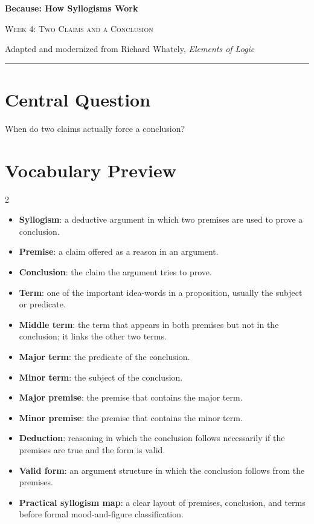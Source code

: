 \documentclass[12pt]{article}
\begin{document}
\begin{center}
{\LARGE\bfseries Because: How Syllogisms Work}\par\vspace{0.25em}
{\large\scshape Week 4: Two Claims and a Conclusion}\par\vspace{0.5em}
{Adapted and modernized from Richard Whately, \textit{Elements of Logic}}\par\vspace{0.6em}
\rule{0.82\textwidth}{0.4pt}
\end{center}

\section*{Central Question}
When do two claims actually force a conclusion?

\section*{Vocabulary Preview}
\begin{multicols}{2}
\begin{itemize}[leftmargin=*, itemsep=0.18em]
\item \textbf{Syllogism}: a deductive argument in which two premises are used to prove a conclusion.
\item \textbf{Premise}: a claim offered as a reason in an argument.
\item \textbf{Conclusion}: the claim the argument tries to prove.
\item \textbf{Term}: one of the important idea-words in a proposition, usually the subject or predicate.
\item \textbf{Middle term}: the term that appears in both premises but not in the conclusion; it links the other two terms.
\item \textbf{Major term}: the predicate of the conclusion.
\item \textbf{Minor term}: the subject of the conclusion.
\item \textbf{Major premise}: the premise that contains the major term.
\item \textbf{Minor premise}: the premise that contains the minor term.
\item \textbf{Deduction}: reasoning in which the conclusion follows necessarily if the premises are true and the form is valid.
\item \textbf{Valid form}: an argument structure in which the conclusion follows from the premises.
\item \textbf{Practical syllogism map}: a clear layout of premises, conclusion, and terms before formal mood-and-figure classification.
\end{itemize}
\end{multicols}
\end{document}
